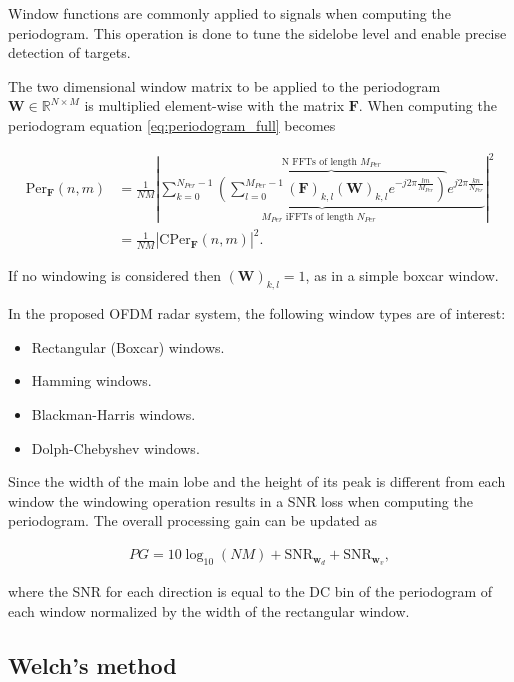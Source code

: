 	Window functions are commonly applied to signals when computing the periodogram. This operation is done to tune the sidelobe level and enable precise detection of targets. 
	
	
	The two dimensional window matrix to be applied to the periodogram $\bm{W} \in \mathbb{R}^{N\times M}$ is multiplied element-wise with the matrix $\bm{F}$. When computing the periodogram equation \ref{eq:periodogram_full} becomes
	
	
	   \begin{align}
		\text{Per}_{\bm{F}}(n,m) &= \frac{1}{NM} \left| \underbrace{ \sum_{k=0}^{N_{Per}-1}  \overbrace{\left( \sum_{l=0}^{M_{Per}-1} (\bm{F})_{k,l} (\bm{W})_{k,l} e^{-j2\pi \frac{lm}{M_{Per}}} \right)}^{\text{N FFTs of length $M_{Per}$}}  e^{j2\pi\frac{kn}{N_{Per}}}}_{ \text{$M_{Per}$ iFFTs of length $N_{Per}$ }} \right| ^ 2 \label{eq:periodogram_full_win}\\
		&= \frac{1}{NM} \left| \text{CPer}_{\bm{F}}(n,m) \right| ^ 2. \label{eq:periodogram_cper_win}
	\end{align}
	 
	 If no windowing is considered then $(\bm{W})_{k,l} = 1$, as in a simple boxcar window.
	 
	 In the proposed OFDM radar system, the following window types are of interest:
	 
	 \begin{itemize}
	 	\item Rectangular (Boxcar) windows.
	 	\item Hamming windows.
	 	\item Blackman-Harris windows.
	 	\item Dolph-Chebyshev windows.
	 \end{itemize}
	
	
	Since the width of the main lobe and the height of its peak is different from each window the windowing operation results in a SNR loss when computing the periodogram.
	The overall processing gain can be updated as
	
	\begin{align}
		PG = 10\log_{10}(NM) + \text{SNR}_{\bm{w}_d} + \text{SNR}_{\bm{w}_v},
	\end{align}
	
	where the SNR for each direction is equal to the DC bin of the periodogram of each window normalized by the width of the rectangular window.
	
	
	\subsection{Welch's method}
	

